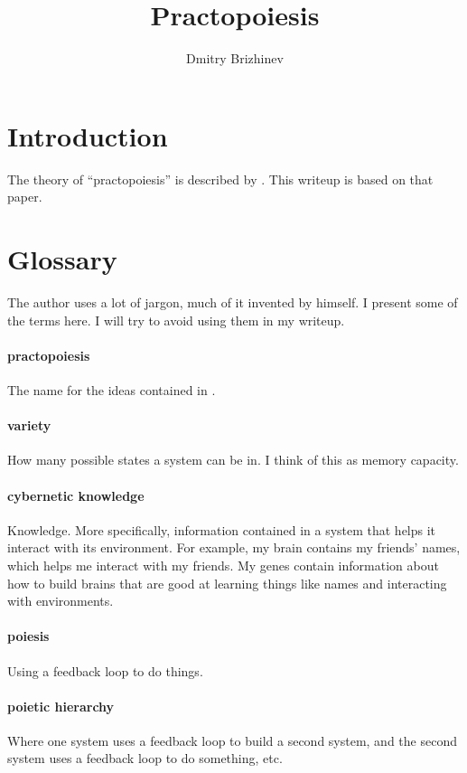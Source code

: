 \documentclass[10pt,a4paper]{article}
\newcommand{\nquote}[1]{``{#1}''}
\begin{document}
\title{\vspace{-10ex}Practopoiesis}
\author{Dmitry Brizhinev}
\maketitle

\section{Introduction}
The theory of \nquote{practopoiesis} is described by \cite{practopoiesis}. This writeup is based on that paper.

\section{Glossary}
The author uses a lot of jargon, much of it invented by himself. I present some of the terms here. I will try to avoid using them in my writeup.

\paragraph{practopoiesis} The name for the ideas contained in \cite{practopoiesis}.

\paragraph{variety} How many possible states a system can be in. I think of this as memory capacity.

\paragraph{cybernetic knowledge} Knowledge. More specifically, information contained in a system that helps it interact with its environment. For example, my brain contains my friends' names, which helps me interact with my friends. My genes contain information about how to build brains that are good at learning things like names and interacting with environments.

\paragraph{poiesis} Using a feedback loop to do things.

\paragraph{poietic hierarchy} Where one system uses a feedback loop to build a second system, and the second system uses a feedback loop to do something, etc.
\end{document}
